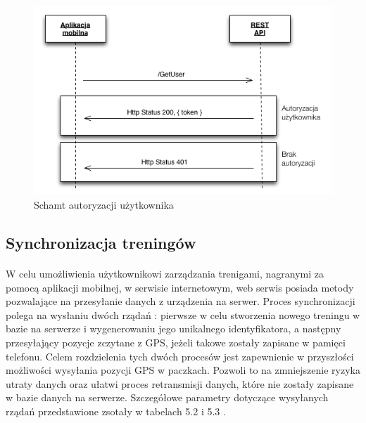 \begin{figure}[ht]
	\centering
		\includegraphics[width=1\linewidth]{assets/auth_schema.png}
		\caption{Schamt autoryzacji użytkownika}
	\label{fig:auth_schema}
\end{figure}

\newpage

\subsection{Synchronizacja treningów} %
\label{sub:synchronizacja_trening_w}
\paragraph{} %
\label{par:}
W celu umożliwienia użytkownikowi zarządzania trenigami, nagranymi za pomocą aplikacji mobilnej, w serwisie internetowym, web serwis posiada metody pozwalające na przesyłanie danych z urządzenia na serwer. Proces synchronizacji polega na wysłaniu dwóch rządań : pierwsze w celu stworzenia nowego treningu w bazie na serwerze i wygenerowaniu jego unikalnego identyfikatora, a następny przesyłający pozycje zczytane z GPS, jeżeli takowe zostały zapisane w pamięci telefonu. Celem rozdzielenia tych dwóch procesów jest zapewnienie w przyszłości możliwości wysyłania pozycji GPS w paczkach. Pozwoli to na zmniejszenie ryzyka utraty danych oraz ułatwi proces retransmisji danych, które nie zostały zapisane w bazie danych na serwerze. Szczegółowe parametry dotyczące wysyłanych rządań przedstawione zsotały w tabelach 5.2 i 5.3 .

